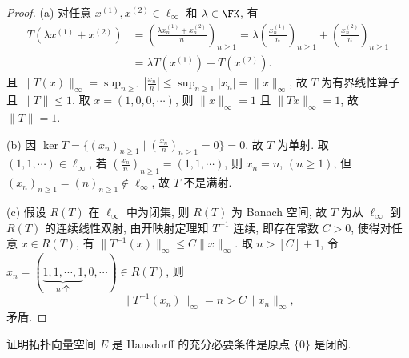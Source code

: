 \documentclass{mathexercise}
\begin{document}
\begin{proof}
    (a) 对任意 $x^{(1)},x^{(2)}\in\ell_{\infty}$ 和 $\lambda\in\FK$, 有
    \begin{align*}
        T(\lambda x^{(1)}+x^{(2)})
        & =\left(\frac{\lambda x^{(1)}_n+x^{(2)}_n}{n}\right)_{n\geq 1}=\lambda\left(\frac{x^{(1)}_n}{n}\right)_{n\geq 1}+\left(\frac{x^{(2)}_n}{n}\right)_{n\geq 1} \\
        & =\lambda T(x^{(1)})+T(x^{(2)}).
    \end{align*}
    且 $\|T(x)\|_{\infty}=\sup_{n\geq 1}\left|\frac{x_n}{n}\right|\leq\sup_{n\geq 1}|x_n|=\|x\|_{\infty}$,
    故 $T$ 为有界线性算子且 $\|T\|\leq 1$.
    取 $x=(1,0,0,\cdots)$, 则 $\|x\|_{\infty}=1$ 且 $\|Tx\|_{\infty}=1$, 故 $\|T\|=1$.

    (b) 因 $\ker T=\Big\{(x_n)_{n\geq 1}\mid \left(\frac{x_n}{n}\right)_{n\geq 1}=0\Big\}=0$,
    故 $T$ 为单射. 取 $(1,1,\cdots)\in\ell_{\infty}$, 若 $\left(\frac{x_n}{n}\right)_{n\geq 1}=(1,1,\cdots)$,
    则 $x_n=n$, $(n\geq 1)$, 但 $(x_n)_{n\geq 1}=(n)_{n\geq 1}\notin\ell_{\infty}$,
     故 $T$ 不是满射.

     (c) 假设 $R(T)$ 在 $\ell_{\infty}$ 中为闭集, 则 $R(T)$ 为 Banach 空间,
     故 $T$ 为从 $\ell_{\infty}$ 到 $R(T)$ 的连续线性双射, 由开映射定理知 $T^{-1}$
     连续, 即存在常数 $C>0$, 使得对任意 $x\in R(T)$, 有 $\|T^{-1}(x)\|_{\infty}\leq C\|x\|_{\infty}$.
     取 $n>[C]+1$, 令 $x_n=(\underbrace{1,1,\cdots,1}_{n\ \text{个}},0,\cdots)\in R(T)$, 则
     \[\|T^{-1}(x_n)\|_{\infty}=n>C\|x_n\|_{\infty},\]
     矛盾.
\end{proof}



\begin{exercise}
    证明拓扑向量空间 $E$ 是 Hausdorff 的充分必要条件是原点 $\{0\}$ 是闭的.
\end{exercise}
\end{document}
